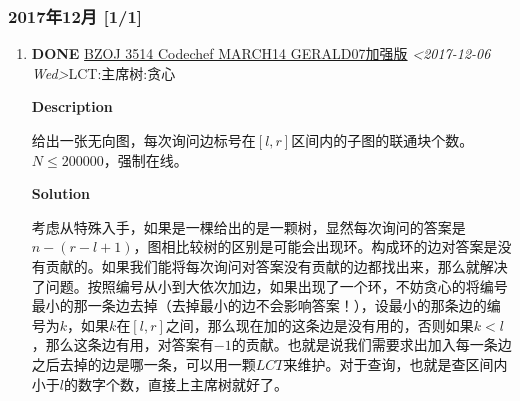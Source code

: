 \documentclass[11pt]{article}
\begin{document}
\subsubsection{2017年12月 [1/1]}
\label{sec-2-2-2}
\begin{enumerate}
\item {\bfseries\sffamily DONE} \href{http://www.lydsy.com/JudgeOnline/problem.php?id=3514}{BZOJ 3514 Codechef MARCH14 GERALD07加强版} \textit{<2017-12-06 Wed>}\hfill{}\textsc{LCT:主席树:贪心}
\label{sec-2-2-2-1}

\textbf{Description}

给出一张无向图，每次询问边标号在\([l,r]\)区间内的子图的联通块个数。\(N \leq 200000\)，强制在线。

\textbf{Solution}

考虑从特殊入手，如果是一棵给出的是一颗树，显然每次询问的答案是\(n-(r-l+1)\)，图相比较树的区别是可能会出现环。构成环的边对答案是没有贡献的。如果我们能将每次询问对答案没有贡献的边都找出来，那么就解决了问题。按照编号从小到大依次加边，如果出现了一个环，不妨贪心的将编号最小的那一条边去掉（去掉最小的边不会影响答案！），设最小的那条边的编号为\(k\)，如果\(k\)在\([l,r]\)之间，那么现在加的这条边是没有用的，否则如果\(k < l\)，那么这条边有用，对答案有\(-1\)的贡献。也就是说我们需要求出加入每一条边之后去掉的边是哪一条，可以用一颗\(LCT\)来维护。对于查询，也就是查区间内小于\(l\)的数字个数，直接上主席树就好了。
\end{enumerate}
\end{document}
